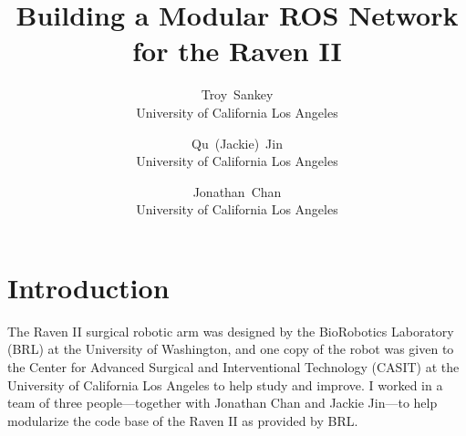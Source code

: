 \documentclass[letterpaper,twocolumn,10pt]{article}
\begin{document}
\date{}

\title{\Large \bf Building a Modular ROS Network for the Raven II}

\author{
{\rm Troy\ Sankey}\\
University of California Los Angeles
\and
{\rm Qu\ (Jackie)\ Jin}\\
University of California Los Angeles
\and
{\rm Jonathan\ Chan}\\
University of California Los Angeles
} %






\section{Introduction}
The Raven II surgical robotic arm was designed by the BioRobotics
Laboratory (BRL) at the University of Washington, and one copy of the
robot was given to the Center for Advanced Surgical and Interventional
Technology (CASIT) at the University of California Los Angeles to help
study and improve. I worked in a team of three people---together with
Jonathan Chan and Jackie Jin---to help modularize the code base of the
Raven II as provided by BRL.
\end{document}
